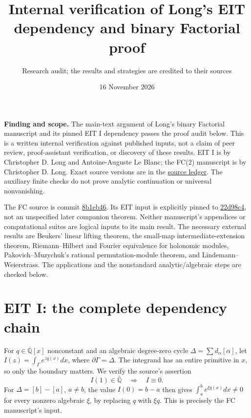 \documentclass[11pt]{article}
\title{Internal verification of Long's EIT dependency and binary Factorial proof}
\author{Research audit; the results and strategies are credited to their sources}
\date{16 November 2026}
\newcommand{\Qb}{\overline{\mathbb Q}}
\begin{document}
\maketitle
\noindent\textbf{Finding and scope.}
The main-text argument of Long's binary Factorial manuscript and its pinned
EIT I dependency passes the proof audit below. This is a written internal
verification against published inputs, not a claim of peer review,
proof-assistant verification, or discovery of these results. EIT I is by
Christopher D. Long and Antoine-Auguste Le Blanc; the FC(2) manuscript is
by Christopher D. Long. Exact source versions are in the
\href{source_ledger.json}{source ledger}. The auxiliary finite checks do
not prove analytic continuation or universal nonvanishing.

The FC source is commit
\href{https://github.com/long-mathematics/factorial-conjecture-two-variables/tree/8b1eb46ff530122ed25f588b78bf9fdc98cb9577}{8b1eb46}.
Its EIT input is explicitly pinned to
\href{https://github.com/long-mathematics/exponential-integral-theorem/blob/22d98c4f27e606b5b25fa673c33f9c56c53cc86b/papers/01-exponential-integral-theorem/exponential-integral-theorem.tex}{22d98c4},
not an unspecified later companion theorem. Neither manuscript's
appendices or computational suites are logical inputs to its main result.
The necessary external results are Beukers' linear lifting theorem,
the small-map intermediate-extension theorem, Riemann--Hilbert and
Fourier equivalence for holonomic modules, Pakovich--Muzychuk's rational
permutation-module theorem, and Lindemann--Weierstrass. The applications
and the nonstandard analytic/algebraic steps are checked below.

\section{EIT I: the complete dependency chain}
For $q\in\Qb[x]$ nonconstant and an algebraic degree-zero cycle
$\Delta=\sum d_\alpha[\alpha]$, let
$I(z)=\int_\Gamma e^{zq(x)}dx$, where $\partial\Gamma=\Delta$.
The integrand has an entire primitive in $x$, so only the boundary matters.
We verify the source's assertion
\[
 I(1)\in\Qb\quad\Longrightarrow\quad I\equiv0.               \tag{E}
\]
For $\Delta=[b]-[a]$, $a\ne b$, the value $I(0)=b-a$ then gives
$\int_a^b e^{\xi q(x)}dx\ne0$ for every nonzero algebraic $\xi$, by
replacing $q$ with $\xi q$. This is precisely the FC manuscript's input.
\end{document}
